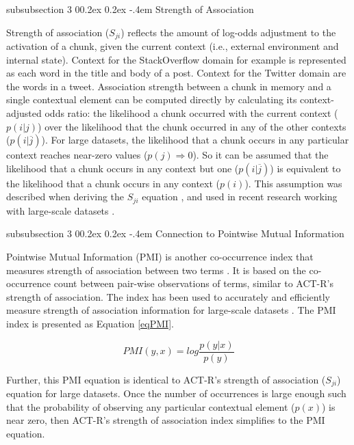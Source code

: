\documentclass[man,floatsintext,donotrepeattitle]{apa6}
\makeatletter
\renewcommand{\subsubsection}{%
  \@startsection
  {subsubsection}%
  {3}%
  {\parindent}%
  {0\baselineskip \@plus 0.2ex \@minus 0.2ex}%
  {-.4em}%
  {\normalfont\normalsize\bfseries\addperi}}
\makeatother
\begin{document}
\subsubsection{Strength of Association}

Strength of association ($S_{ji}$) reflects the amount of log-odds adjustment to the activation of a chunk, given the current context (i.e., external environment and internal state).
Context for the StackOverflow domain for example is represented as each word in the title and body of a post.
Context for the Twitter domain are the words in a tweet.
Association strength between a chunk in memory and a single contextual element can be computed directly by calculating its context-adjusted odds ratio:
the likelihood a chunk occurred with the current context ($p(i|j)$) over the likelihood that the chunk occurred in any of the other contexts ($p(i|\overline{j})$).
For large datasets, the likelihood that a chunk occurs in any particular context reaches near-zero values ($p(j) \Rightarrow 0$).
So it can be assumed that the likelihood that a chunk occurs in any context but one ($p(i|\overline{j})$) is equivalent to the likelihood that a chunk occurs in any context ($p(i)$).
This assumption was described when deriving the $S_{ji}$ equation \parencite{Anderson1989}, and used in recent research working with large-scale datasets \parencites{Stanley2013,Farahat2004,Douglass2010}.

\subsubsection{Connection to Pointwise Mutual Information}

Pointwise Mutual Information (PMI) is another co-occurrence index that measures strength of association between two terms \parencite{Farahat2004}.
It is based on the co-occurrence count between pair-wise observations of terms, similar to ACT-R's strength of association.
The index has been used to accurately and efficiently measure strength of association information for large-scale datasets \parencite{Budiu2007,Farahat2004}.
The PMI index is presented as Equation \eqref{eqPMI}.

\begin{equation}
  \label{eqPMI}
  \mathit{PMI}(y,x) = log \frac{p(y|x)}{p(y)}
\end{equation}

Further, this PMI equation is identical to ACT-R's strength of association ($S_{ji}$) equation for large datasets.
Once the number of occurrences is large enough such that the probability of observing any particular contextual element ($p(x)$) is near zero, then ACT-R's strength of association index simplifies to the PMI equation.
\end{document}
